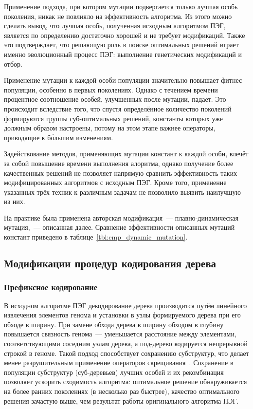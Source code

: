 Применение подхода, при котором мутации подвергается только лучшая особь поколения, никак не повлияло на эффективность алгоритма. Из этого можно сделать вывод, что лучшая особь, полученная исходным алгоритмом ПЭГ, является по определению достаточно хорошей и не требует модификаций. Также это подтверждает, что решающую роль в поиске оптимальных решений играет именно эволюционный процесс ПЭГ: выполнение генетических модификаций и отбор.

Применение мутации к каждой особи популяции значительно повышает фитнес популяции, особенно в первых поколениях. Однако с течением времени процентное соотношение особей, улучшенных после мутации, падает. Это происходит вследствие того, что спустя определённое количество поколений формируются группы суб-оптимальных решений, константы которых уже должным образом настроены, потому на этом этапе важнее операторы, приводящие к б\'{о}льшим изменениям.

Задействование методов, применяющих мутации констант к каждой особи, влечёт за собой повышение времени выполнения алоритма, однако получение более качественных решений не позволяет напрямую сравнить эффективность таких модифицированных алгоритмов с исходным ПЭГ. Кроме того, применение указанных трёх техник к различным задачам не позволило выявить наилучшую из них.

На практике была применена авторская модификация~--- плавно-динамическая мутация,~--- описанная далее. Сравнение эффективности описанных мутаций констант приведено в таблице~\ref{tbl:cmp_dynamic_mutation}.




\subsection{Модификации процедур кодирования дерева}

\subsubsection{Префиксное кодирование}

В исходном алгоритме ПЭГ декодирование дерева производится путём линейного извлечения элементов генома и установки в узлы формируемого дерева при его обходе в ширину. При замене обхода дерева в ширину обходом в глубину повышается связность генома~--- уменьшается расстояние между элементами, соответствующими соседним узлам дерева, а под-дерево кодируется непрерывной строкой в геноме. Такой подход способствует сохранению субструктур, что делает менее разрушительным применение операторов скрещивания~\cite{Li:gecco05lbp}. Сохранение в популяции субструктур (суб-деревьев) лучших особей и их рекомбинация позволяет ускорить сходимость алгоритма: оптимальное решение обнаруживается на более ранних поколениях (в несколько раз быстрее), качество оптимального решения зачастую выше, чем результат работы оригинального алгоритма ПЭГ.

